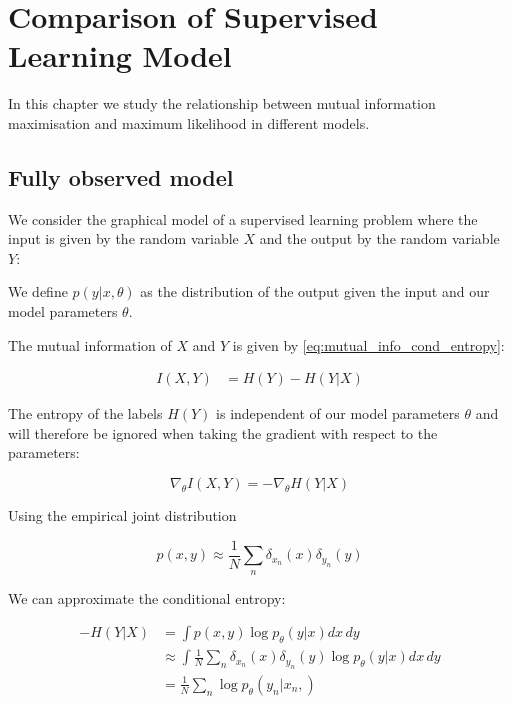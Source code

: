 \documentclass[11pt,oneside,openright]{report}
\begin{document}
\chapter{Comparison of Supervised Learning Model}

In this chapter we study the relationship between mutual information maximisation and maximum likelihood in different models.

\section{Fully observed model}

We consider the graphical model of a supervised learning problem where the input is given by the random variable $X$ and the output by the random variable $Y$:

\begin{figure}[H]
\centering
{}
\end{figure}

We define $p(y|x, \theta)$ as the distribution of the output given the input and our model parameters $\theta$.

The mutual information of $X$ and $Y$ is given by \ref{eq:mutual_info_cond_entropy}:

\begin{align}
I(X, Y) &= H(Y) - H(Y|X)
\end{align}

The entropy of the labels $H(Y)$ is independent of our model parameters $\theta$ and will therefore be ignored when taking the gradient with respect to the parameters:

$$ \nabla_\theta I(X,Y) = -\nabla_\theta H(Y|X)$$ 

Using the empirical joint distribution 

$$p(x, y) \approx \frac{1}{N}\sum_n\delta_{x_n}(x)\delta_{y_n}(y)$$

We can approximate the conditional entropy:

\begin{align}
- H(Y|X) &= \int p(x, y) \log p_\theta(y|x) dx\, dy\\
	      &\approx \int \frac{1}{N}\sum_n\delta_{x_n}(x)\delta_{y_n}(y) \log p_\theta(y|x)dx\, dy\\
	      &= \frac{1}{N} \sum_n \log p_\theta(y_n|x_n,)
\end{align}
\end{document}

